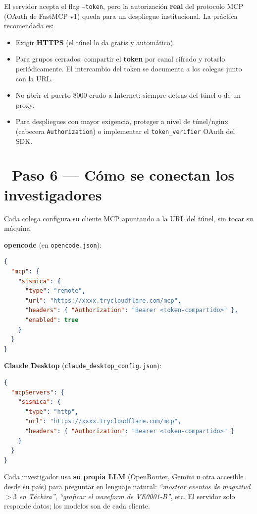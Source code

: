 \documentclass[11pt,a4paper]{article}
\newcommand{\iconotexto}[2]{\textcolor{cyanNeon}{\faIcon{#1}}~#2}
\begin{document}
\begin{tcolorbox}[cajaRecomendacion, title={\faIcon{user-secret}~Proteger el endpoint}]
El servidor acepta el flag \texttt{--token}, pero la autorizaci\'on \textbf{real} del protocolo MCP
(OAuth de FastMCP v1) queda para un despliegue institucional. La pr\'actica recomendada es:
\begin{itemize}[leftmargin=1.6em, itemsep=2pt]
  \item Exigir \textbf{HTTPS} (el t\'unel lo da gratis y autom\'atico).
  \item Para grupos cerrados: compartir el \textbf{token} por canal cifrado y rotarlo peri\'odicamente.
        El intercambio del token se documenta a los colegas junto con la URL.
  \item No abrir el puerto 8000 crudo a Internet: siempre detras del t\'unel o de un proxy.
  \item Para despliegues con mayor exigencia, proteger a nivel de t\'unel/nginx (cabecera
        \texttt{Authorization}) o implementar el \texttt{token\_verifier} OAuth del SDK.
\end{itemize}
\end{tcolorbox}

\section{\iconotexto{users}{Paso 6 --- C\'omo se conectan los investigadores}}

Cada colega configura su cliente MCP apuntando a la URL del t\'unel, sin tocar su m\'aquina.

\textbf{opencode} (en \texttt{opencode.json}):
\begin{lstlisting}[language=json]
{
  "mcp": {
    "sismica": {
      "type": "remote",
      "url": "https://xxxx.trycloudflare.com/mcp",
      "headers": { "Authorization": "Bearer <token-compartido>" },
      "enabled": true
    }
  }
}
\end{lstlisting}

\textbf{Claude Desktop} (\texttt{claude\_desktop\_config.json}):
\begin{lstlisting}[language=json]
{
  "mcpServers": {
    "sismica": {
      "type": "http",
      "url": "https://xxxx.trycloudflare.com/mcp",
      "headers": { "Authorization": "Bearer <token-compartido>" }
    }
  }
}
\end{lstlisting}

\begin{tcolorbox}[cajaContenido, title={\faIcon{question-circle}~Qu\'e puede hacer cada colega}]
Cada investigador usa \textbf{su propia LLM} (OpenRouter, Gemini u otra accesible desde su pa\'is)
para preguntar en lenguaje natural: \emph{``mostrar eventos de magnitud $>3$ en T\'achira''},
\emph{``graficar el waveform de VE0001-B''}, etc. El servidor solo responde datos; los modelos son
de cada cliente.
\end{tcolorbox}
\end{document}
